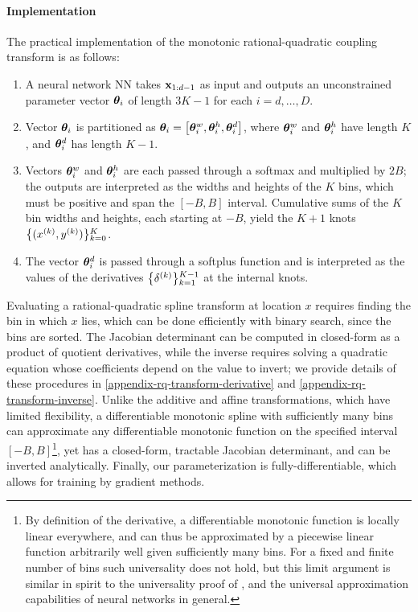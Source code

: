 \paragraph{Implementation} The practical implementation of the monotonic rational-quadratic coupling transform is as follows:
\begin{enumerate}[topsep=0pt, itemsep=1pt]
    \item A neural network NN takes $\mathbf{x}_{1:d-1}$ as input and outputs an unconstrained parameter vector $ \bm{\theta}_{i} $ of length $ 3K - 1$ for each $i=d, \dots, D$.
    \item Vector $ \bm{\theta}_{i} $ is partitioned as $ \bm{\theta}_{i} =\mathopen{}\left[\bm{\theta}_{i}^{w},\bm{\theta}_{i}^{h}, \bm{\theta}_{i}^{d}\right]\mathclose{}$, where $\bm{\theta}_{i}^{w}$ and $\bm{\theta}_{i}^{h}$ have length $K$, and $\bm{\theta}_{i}^{d}$ has length $ K - 1 $.
    \item Vectors $\bm{\theta}_{i}^{w}$ and $\bm{\theta}_{i}^{h}$ are each passed through a softmax and multiplied by $2B$; the outputs are interpreted as the widths and heights of the $ K $ bins, which must be positive and span the $[-B, B]$ interval. Cumulative sums of the $K$ bin widths and heights, each starting at $-B$, yield the $ K\!+\!1 $ knots $\mathopen{}\left\lbrace(x^{(k)}, y^{(k)})\right\rbrace\mathclose{}_{k=0}^K$. 
    \item The vector $\bm{\theta}_{i}^{d}$ is passed through a softplus function and is interpreted as the values of the derivatives $ \mathopen{}\left\lbrace\delta^{(k)}\right\rbrace\mathclose{}_{k=1}^{K-1} $ at the internal knots.
\end{enumerate}
Evaluating a rational-quadratic spline transform at location $ x $ requires finding the bin in which $ x $ lies, which can be done efficiently with binary search, since the bins are sorted. 
The Jacobian determinant can be computed in closed-form as a product of quotient derivatives, while the inverse requires solving a quadratic equation whose coefficients depend on the value to invert;  we provide details of these procedures in \cref{appendix-rq-transform-derivative} and \cref{appendix-rq-transform-inverse}.
Unlike the additive and affine transformations, which have limited flexibility, a differentiable monotonic spline with sufficiently many bins can approximate any differentiable monotonic function on the specified interval $ [-B, B] $\footnote{By definition
of the derivative, a differentiable monotonic function is locally linear everywhere, and can thus be approximated by a piecewise linear function arbitrarily well given sufficiently many bins. For a fixed and finite number of bins such universality does not hold, but this limit argument is similar in spirit to the universality proof of \citet{Huang:2018:naf}, and the universal approximation capabilities of neural networks in general.}, yet has a closed-form, tractable Jacobian determinant, and can be inverted analytically.
Finally, our parameterization is fully-differentiable, which allows for training by gradient methods.

